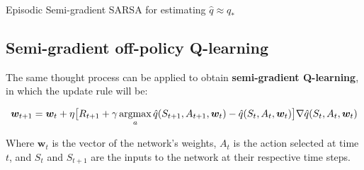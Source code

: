 \begin{algorithm}[H]
\DontPrintSemicolon
\SetAlgoVlined
{}

\caption{Episodic Semi-gradient SARSA for estimating $\hat{q} \approx q_*$}
\end{algorithm}

\subsection{Semi-gradient off-policy Q-learning}
The same thought process can be applied to obtain \textbf{semi-gradient Q-learning}, in which the update rule will be:

\begin{equation}
    \boldsymbol{w}_{t+1} = \boldsymbol{w}_t + \eta \big[ R_{t+1} + \gamma \operatorname*{argmax}_a  \hat{q}(S_{t+1},A_{t+1},\boldsymbol{w}_t) - \hat{q}(S_t,A_t,\boldsymbol{w}_t) \big] \nabla \hat{q}(S_t,A_t,\boldsymbol{w}_t)
    \label{eq:ch7-qlearningqvaluefunctionapproxssdweightupdate}
\end{equation}

Where $\boldsymbol{w}_t$ is the vector of the network’s weights, $A_t$ is the action selected at time $t$, and $S_t$ and $S_{t+1}$ are the inputs to the network at their respective time steps.


